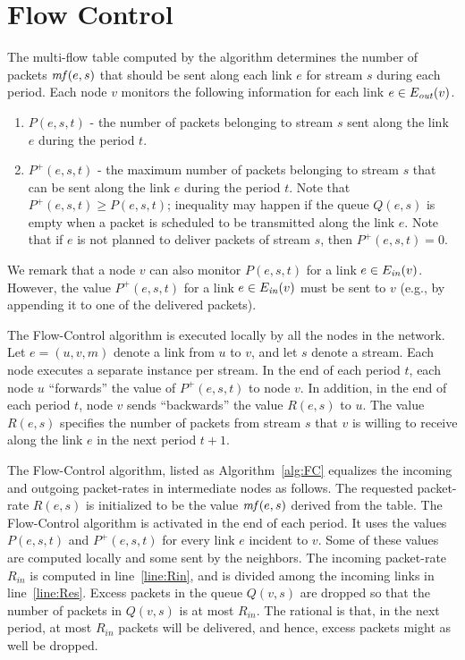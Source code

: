 \documentclass[12pt]{article}
\newenvironment{proof sketch}[1]{\noindent {\emph{Proof sketch of #1:}}}{\hfill \qed}
\newcommand{\mf}{\text{\emph{mf}}}
\newcommand{\Ein}{E_{\text{\emph{in}}}}
\newcommand{\Eout}{E_{\text{\emph{out}}}}
\begin{document}
\section{Flow Control}\label{sec:flow control}
The multi-flow table computed by the algorithm determines the number of packets $\mf(e,s)$
that should be sent along each link $e$ for stream $s$ during each period.
Each node $v$ monitors the following information for each link $e \in \Eout (v)$.
\begin{enumerate}
\item $P(e,s,t)$ - the number of packets belonging to stream $s$ sent
  along the link $e$ during the period $t$.
\item $P^+(e,s,t)$ - the maximum number of packets belonging to stream
  $s$ that can be sent along the link $e$ during the period $t$. Note
  that $P^+(e,s,t)\geq P(e,s,t)$; inequality may happen if the queue
  $Q(e,s)$ is empty when a packet is scheduled to be transmitted along
  the link $e$. Note that if $e$ is not planned to deliver packets of
  stream $s$, then $P^+(e,s,t)=0$.
\end{enumerate}
We remark that a node $v$ can also monitor $P(e,s,t)$ for a link $e\in
\Ein(v)$.  However, the value $P^+(e,s,t)$ for a link $e\in \Ein(v)$
must be sent to $v$ (e.g., by appending it to one of the delivered
packets).

The Flow-Control algorithm is executed locally by all the nodes in the
network. Let $e=(u,v,m)$ denote a link from $u$ to $v$, and let $s$
denote a stream. Each node executes a separate instance per stream.
In the end of each period $t$, each node $u$ ``forwards'' the value of
$P^+(e,s,t)$ to node $v$.  In addition, in the end of each period $t$,
node $v$ sends ``backwards'' the value $R(e,s)$ to $u$. The value
$R(e,s)$ specifies the number of packets from stream $s$ that $v$ is
willing to receive along the link $e$ in the next period
$t+1$.

The Flow-Control algorithm, listed as Algorithm~\ref{alg:FC} equalizes
the incoming and outgoing packet-rates in intermediate nodes as
follows.  The requested packet-rate $R(e,s)$ is initialized to be the
value $\mf(e,s)$ derived from the table.  The Flow-Control algorithm is
activated in the end of each period.  It uses the values $P(e,s,t)$
and $P^+(e,s,t)$ for every link $e$ incident to $v$.  Some of these
values are computed locally and some sent by the neighbors. The
incoming packet-rate $R_{in}$ is computed in line~\ref{line:Rin}, and
is divided among the incoming links in line~\ref{line:Res}. Excess
packets in the queue $Q(v,s)$ are dropped
so that the number of packets in $Q(v,s)$ is at most $R_{in}$. The
rational is that, in the next period, at most $R_{in}$ packets will be
delivered, and hence, excess packets might as well be dropped.
\end{document}
